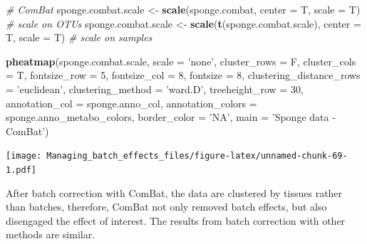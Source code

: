 \documentclass[]{book}
\newenvironment{Shaded}{\begin{snugshade}}{\end{snugshade}}
\newcommand{\KeywordTok}[1]{\textcolor[rgb]{0.13,0.29,0.53}{\textbf{#1}}}
\newcommand{\DataTypeTok}[1]{\textcolor[rgb]{0.13,0.29,0.53}{#1}}
\newcommand{\DecValTok}[1]{\textcolor[rgb]{0.00,0.00,0.81}{#1}}
\newcommand{\StringTok}[1]{\textcolor[rgb]{0.31,0.60,0.02}{#1}}
\newcommand{\CommentTok}[1]{\textcolor[rgb]{0.56,0.35,0.01}{\textit{#1}}}
\newcommand{\NormalTok}[1]{#1}
\begin{document}
\begin{Shaded}
\begin{Highlighting}[]
\CommentTok{# ComBat }
\NormalTok{sponge.combat.scale <-}\StringTok{ }\KeywordTok{scale}\NormalTok{(sponge.combat, }\DataTypeTok{center =}\NormalTok{ T, }\DataTypeTok{scale =}\NormalTok{ T) }
\CommentTok{# scale on OTUs}
\NormalTok{sponge.combat.scale <-}\StringTok{ }\KeywordTok{scale}\NormalTok{(}\KeywordTok{t}\NormalTok{(sponge.combat.scale), }\DataTypeTok{center =}\NormalTok{ T, }\DataTypeTok{scale =}\NormalTok{ T) }
\CommentTok{# scale on samples}

\KeywordTok{pheatmap}\NormalTok{(sponge.combat.scale, }
         \DataTypeTok{scale =} \StringTok{'none'}\NormalTok{, }
         \DataTypeTok{cluster_rows =}\NormalTok{ F, }
         \DataTypeTok{cluster_cols =}\NormalTok{ T, }
         \DataTypeTok{fontsize_row =} \DecValTok{5}\NormalTok{, }\DataTypeTok{fontsize_col =} \DecValTok{8}\NormalTok{,}
         \DataTypeTok{fontsize =} \DecValTok{8}\NormalTok{,}
         \DataTypeTok{clustering_distance_rows =} \StringTok{'euclidean'}\NormalTok{,}
         \DataTypeTok{clustering_method =} \StringTok{'ward.D'}\NormalTok{,}
         \DataTypeTok{treeheight_row =} \DecValTok{30}\NormalTok{,}
         \DataTypeTok{annotation_col =}\NormalTok{ sponge.anno_col,}
         \DataTypeTok{annotation_colors =}\NormalTok{ sponge.anno_metabo_colors,}
         \DataTypeTok{border_color =} \StringTok{'NA'}\NormalTok{,}
         \DataTypeTok{main =} \StringTok{'Sponge data - ComBat'}\NormalTok{)}
\end{Highlighting}
\end{Shaded}

\texttt{[image: Managing\_batch\_effects\_files/figure-latex/unnamed-chunk-69-1.pdf]}

After batch correction with ComBat, the data are clustered by tissues
rather than batches, therefore, ComBat not only removed batch effects,
but also disengaged the effect of interest. The results from batch
correction with other methods are similar.
\end{document}
